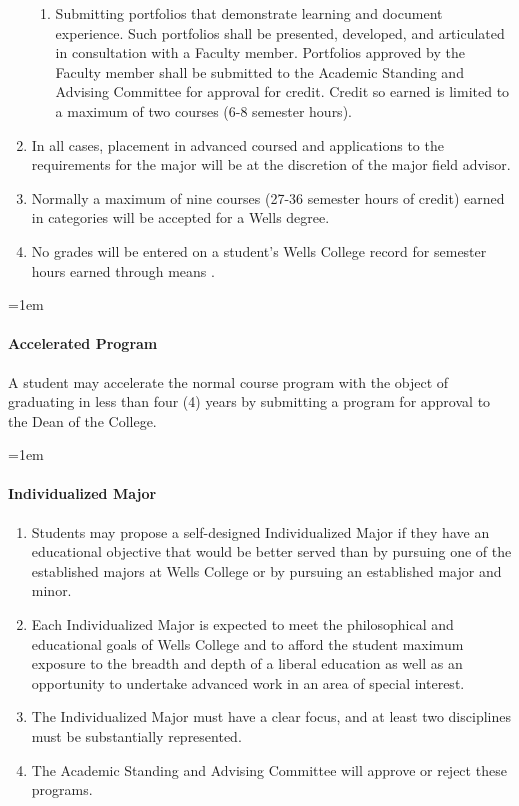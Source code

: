 \documentclass{manual}
\newcommand{\modified}[1]{}
\let\oldparagraph\paragraph
\renewcommand\paragraph{\leftskip=1em\oldparagraph}
\newcommand{\itemLevelA}{\alph*.}
\newcommand{\itemLevelB}{\arabic*)}
\newcommand{\itemRefA}{\alph*}
\newcommand{\itemRefB}{\arabic*}
\begin{document}
\begin{enumerate}[label=\itemLevelA,ref=\itemRefA]
\begin{enumerate}[label=\itemLevelB,ref=\itemRefB]
\item \label{iitem:portfolio} Submitting portfolios that demonstrate learning and document experience. Such portfolios shall be presented, developed, and articulated in consultation with a Faculty member. Portfolios approved by the Faculty member shall be submitted to the Academic Standing and Advising Committee for approval for credit. Credit so earned is limited to a maximum of two courses (6-8 semester hours).
\end{enumerate}

\item In all cases, placement in advanced coursed and applications to the requirements for the major will be at the discretion of the major field advisor.
\item Normally a maximum of nine courses (27-36 semester hours of credit) earned in categories  will be accepted for a Wells degree.
\item No grades will be entered on a student's Wells College record for semester hours earned through means .
\end{enumerate}

\paragraph{Accelerated Program}
A student may accelerate the normal course program with the object of graduating in less than four (4) years by submitting a program for approval to the Dean of the College.

\paragraph{Individualized Major}

\begin{enumerate}[label=\itemLevelA,ref=\itemRefA]
\item  Students may propose a self-designed Individualized Major if they have an educational objective \modified{11/10/2009} that would be better served than by pursuing one of the established majors at Wells College or by pursuing an established major and minor.  
\item Each Individualized Major is expected to meet the philosophical and educational goals of Wells College and to afford the student maximum exposure to the breadth and depth of a liberal education as well as an opportunity to undertake advanced work in an area of special interest.  
\item The Individualized Major must have a clear focus, and at least two disciplines must be substantially represented. 
\item The Academic Standing and Advising Committee will approve or reject these programs.
\end{enumerate}
\end{document}
